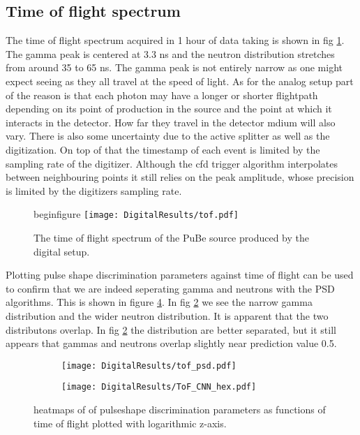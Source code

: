 \documentclass[main.tex]{subfiles}
\begin{document}
\clearpage
\subsection{Time of flight spectrum}
The time of flight spectrum acquired in 1 hour of data taking is shown in fig \ref{fig:D_TOF}. The gamma peak is centered at 3.3 ns and the neutron distribution stretches from around 35 to 65 ns. The gamma peak is not entirely narrow as one might expect seeing as they all travel at the speed of light. As for the analog setup part of the reason is that each photon may have a longer or shorter flightpath depending on its point of production in the source and the point at which it interacts in the detector. How far they travel in the detector mdium will also vary. There is also some uncertainty due to the active splitter as well as the digitization. On top of that the timestamp of each event is limited by the sampling rate of the digitizer. Although the cfd trigger algorithm interpolates between neighbouring points it still relies on the peak amplitude, whose precision is limited by the digitizers sampling rate.
\begin{figure}[ht!]
begin{figure}
    \centering
        \texttt{[image: DigitalResults/tof.pdf]}
        \caption{The time of flight spectrum of the PuBe source produced by the digital setup.}
    \label{fig:D_TOF} 
\end{figure}

Plotting pulse shape discrimination parameters against time of flight can be used to confirm that we are indeed seperating gamma and neutrons with the PSD algorithms. This is shown in figure \ref{fig:tof_cc_tof_cnn}. In fig \ref{fig:tof_digi_cc} we see the narrow gamma distribution and the wider neutron distribution. It is apparent that the two distributons overlap. In fig \ref{fig:tof_digi_cc} the distribution are better separated, but it still appears that gammas and neutrons overlap slightly near prediction value 0.5.
\begin{figure}
    \centering
    \begin{subfigure}[ht]{0.49\textwidth}
        \texttt{[image: DigitalResults/tof\_psd.pdf]}
        \caption{}
        \label{fig:tof_digi_cc}
    \end{subfigure}
	\begin{subfigure}[ht]{0.49\textwidth}
        \texttt{[image: DigitalResults/ToF\_CNN\_hex.pdf]}
        \caption{}
        \label{fig:tof_digi_cnn}
    \end{subfigure}
    \caption{heatmaps of of pulseshape discrimination parameters as functions of time of flight plotted with logarithmic z-axis.}
    \label{fig:tof_cc_tof_cnn}
\end{figure}
\end{document}
